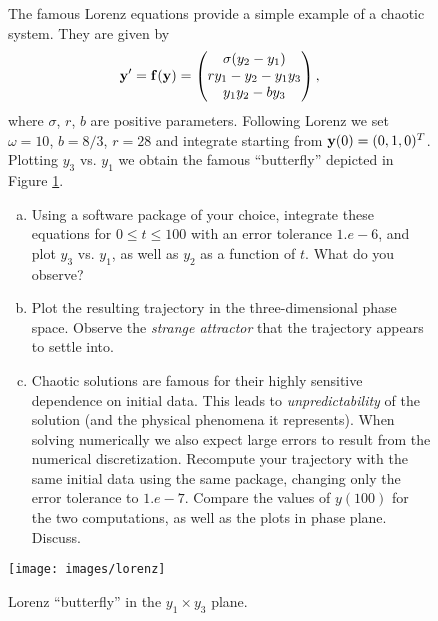 \begin{figure}
  
  \begin{problem}[A\&P 5.5]
    The famous Lorenz equations provide a simple example of a chaotic system. They are given by
    \[
      \mathbf{y}' = \mathbf{f}(\mathbf{y}) = 
      \begin{pmatrix}
        \sigma(y_2 - y_1) \\
        r y_1 - y_2 - y_1 y_3 \\
        y_1 y_2 - b y_3
      \end{pmatrix},
    \]
    where $\sigma$, $r$, $b$ are positive parameters. Following Lorenz we set $\omega = 10$, $b = 8/3$, $r = 28$ and integrate starting from $\mathbf{y}(0) = (0, 1, 0)^T$. Plotting $y_3$ vs. $y_1$ we obtain the famous ``butterfly'' depicted in Figure \ref{F:lorenz}.
    \begin{enumerate}[(a)]
      \item Using a software package of your choice, integrate these equations for $0 \leq t \leq 100$ with an error tolerance $1.e - 6$, and plot $y_3$ vs. $y_1$, as well as $y_2$ as a function of $t$. What do you observe?
      \item Plot the resulting trajectory in the three-dimensional phase space. Observe the \emph{strange attractor} that the trajectory appears to settle into.
      \item Chaotic solutions are famous for their highly sensitive dependence on initial data. This leads to \emph{unpredictability} of the solution (and the physical phenomena it represents). When solving numerically we also expect large errors to result from the numerical discretization. Recompute your trajectory with the same initial data using the same package, changing only the error tolerance to $1.e - 7$. Compare the values of $y(100)$ for the two computations, as well as the plots in phase plane. Discuss.
    \end{enumerate}
  
    \centering
    \texttt{[image: images/lorenz]}
    \caption{Lorenz ``butterfly'' in the $y_1 \times y_3$ plane.}
    \label{F:lorenz}
  \end{problem}
\end{figure}

\FloatBarrier

\begin{solution}
  
\end{solution}